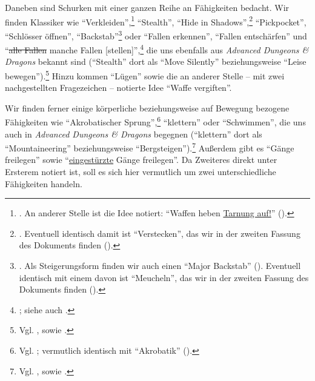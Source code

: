 \documentclass[a5paper,pagesize,numbers=noenddot]{scrbook}
\begin{document}
Daneben sind Schurken mit einer ganzen Reihe an Fähigkeiten bedacht.
Wir finden Klassiker wie \enquote{Verkleiden},\footnote{\autocite[S.~5]{orpheus_gildensystem}. An anderer Stelle ist die Idee notiert: \enquote{Waffen heben \uline{Tarnung auf!}} (\autocite[S.~18]{orpheus_b_scribbles}).} \enquote{Stealth},\autocite[S.~5]{orpheus_gildensystem} \enquote{Hide in Shadows},\footnote{\autocite[S.~5]{orpheus_gildensystem}. Eventuell identisch damit ist \enquote{Verstecken}, das wir in der zweiten Fassung des Dokuments finden (\autocite[S.~3]{orpheus_gildensystem_v2}).} \enquote{Pickpocket},\autocite[S.~9]{orpheus_gildensystem} \enquote{Schlösser öffnen},\autocite[S.~9]{orpheus_gildensystem} \enquote{Backstab}\footnote{\autocite[S.~5]{orpheus_gildensystem}. Als Steigerungsform finden wir auch einen \enquote{Major Backstab} (\autocite[S.~1]{orpheus_gildensystem}). Eventuell identisch mit einem davon ist \enquote{Meucheln}, das wir in der zweiten Fassung des Dokuments finden (\autocite[S.~1, 3]{orpheus_gildensystem_v2}).} oder \enquote{Fallen erkennen}, \enquote{Fallen entschärfen}\autocite[S.~9]{orpheus_gildensystem} und \enquote{\sout{alle Fallen} manche Fallen [stellen]},\footnote{\autocite[S.~13]{orpheus_gildensystem}; siehe auch \autocite[S.~15]{orpheus_gildensystem}.} die uns ebenfalls aus \textit{Advanced Dungeons \& Dragons} bekannt sind (\enquote{Stealth} dort als \enquote{Move Silently} beziehungsweise \enquote{Leise bewegen}).\footnote{Vgl. \autocite[S.~39\,f., 58, 63]{cook_adnd_1989}, sowie \autocite[S.~56\,ff., 80, 86]{cook_adnd_1996}.}
Hinzu kommen \enquote{Lügen}\autocite[S.~5]{orpheus_gildensystem} sowie die an anderer Stelle -- mit zwei nachgestellten Fragezeichen -- notierte Idee \enquote{Waffe vergiften}.\autocite[S.~8]{orpheus_b_scribbles}

Wir finden ferner einige körperliche beziehungsweise auf Bewegung bezogene Fähigkeiten wie \enquote{Akrobatischer Sprung},\footnote{Vgl. \autocite[S.~9]{orpheus_gildensystem}; vermutlich identisch mit \enquote{Akrobatik} (\autocite[S.~14]{orpheus_b_scribbles}).} \enquote{klettern}\autocite[S.~9]{orpheus_gildensystem} oder \enquote{Schwimmen}, \autocite[S.~14]{orpheus_b_scribbles} die uns auch in \textit{Advanced Dungeons \& Dragons} begegnen (\enquote{klettern} dort als \enquote{Mountaineering} beziehungsweise \enquote{Bergsteigen}).\footnote{Vgl. \autocite[S.~61, 64]{cook_adnd_1989}, sowie \autocite[S.~79, 83\,f.]{cook_adnd_1996}.}
Außerdem gibt es \enquote{Gänge freilegen} sowie \enquote{\uline{eingestürzte} Gänge freilegen}.\autocite[S.~5]{orpheus_gildensystem}
Da Zweiteres direkt unter Ersterem notiert ist, soll es sich hier vermutlich um zwei unterschiedliche Fähigkeiten handeln.
\end{document}
